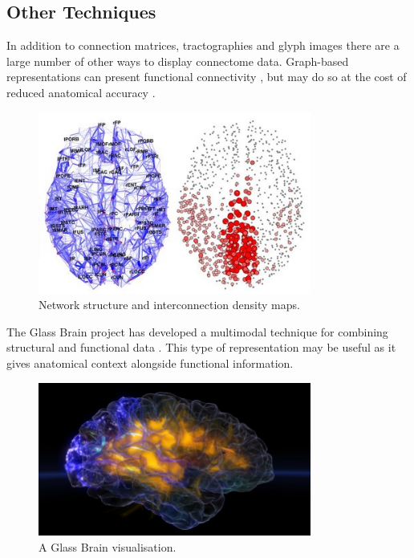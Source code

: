 \documentclass[MSc,paper=a4,pagesize=auto]{icldt}
\begin{document}
\subsection{Other Techniques}
In addition to connection matrices, tractographies and glyph images there are a large number of other ways to display connectome data. Graph-based representations can present functional connectivity \cite{Hagmann2008}, but may do so at the cost of reduced anatomical accuracy \cite{Margulies2013}. 

\begin{figure}[htbp!]
    \centering
    \includegraphics[width=0.8\textwidth]{resources/connectome_graphs}
    \caption{Network structure and interconnection density maps. \cite{Hagmann2005}}
    \label{fig:connectome_graphs}
\end{figure}

The Glass Brain project has developed a multimodal technique for combining structural and functional data \cite{GlassBrain2014}. This type of representation may be useful as it gives anatomical context alongside functional information. 

\begin{figure}[htbp!]
    \centering
    \includegraphics[width=0.8\textwidth]{resources/glass_brain}
    \caption{A Glass Brain visualisation. \cite{GlassBrain2014}}
    \label{fig:glass_brain}
\end{figure}
\end{document}
